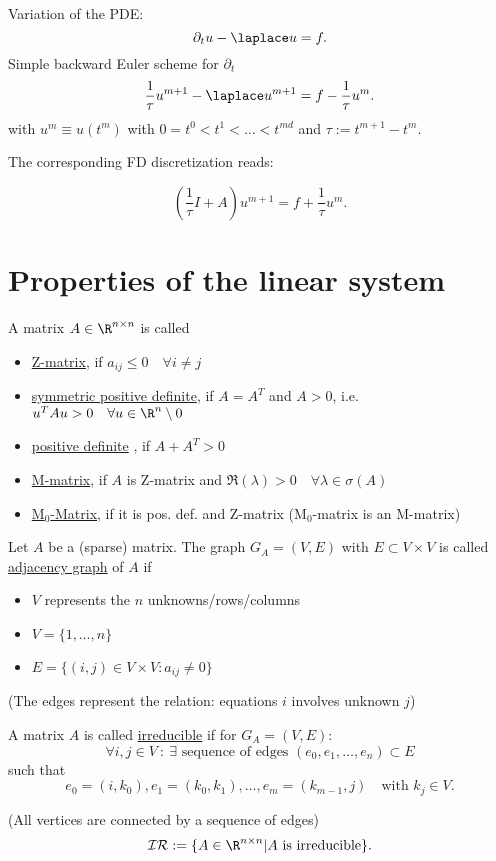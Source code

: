 Variation of the PDE:
\[
\partial_{t}u- \laplace u=f
.\] 
Simple backward Euler scheme for $\partial_{t}$
\[
\frac{1}{\tau}u^{m+1}- \laplace u^{m+1} = f -\frac{1}{\tau}u^{m}
.\] 
with $u^{m} \equiv u(t^{m})$ with $0=t^{0}<t^{1}< \ldots  < t^{md}$ and $\tau:=t^{m+1}-t^{m}$.

The corresponding FD discretization reads:

\[
	\left(\frac{1}{\tau}I + A\right) u^{m+1} = f + \frac{1}{\tau}u^{m}
.\] 

\section{Properties of the linear system}%
\label{sec:Properties of the linear system}

\begin{definition}
\label{thm:typeOfMatrices}
	A matrix $A \in  \R^{n \times n}$ is called
	\begin{itemize}
		\item \underline{Z-matrix}, if $a_{ij}\leq 0\quad \forall i\neq j$
		\item \underline{symmetric positive definite}, if $A=A^{T}$ and $A>0$, i.e. $u^{T}Au>0\quad\forall u \in \R^{n} \setminus 0$
		\item \underline{positive definite} , if $A+A^{T}>0$
		\item \underline{M-matrix}, if $A$ is Z-matrix and $\Re(\lambda) > 0 \quad\forall \lambda \in \sigma (A)$
		\item \underline{M$_{0}$-Matrix}, if it is pos. def. and Z-matrix (M$_{0}$-matrix is an M-matrix)
	\end{itemize}
\end{definition}

\begin{definition}
\label{thm:adjacenyGraph}
Let $A$ be a (sparse) matrix. The graph $G_{A}=(V,E)$ with $E \subset V \times V$ is called \underline{adjacency graph} of $A$ if 
\begin{itemize}[label=]
	\item $V$ represents the $n$ unknowns/rows/columns
	\item $V=\{1, \ldots, n\}$
	\item $E=\{(i,j) \in  V \times V : a_{ij}\neq 0\}$
\end{itemize}
(The edges represent the relation: equations $i$ involves unknown $j$)
\end{definition}

\begin{definition}
\label{thm:irreducible}
A matrix $A$ is called \underline{irreducible} if for $G_{A}=(V,E)$:
\[
	\forall i,j \in V ~:~ \exists \text{ sequence of edges } (e_0, e_1, \ldots , e_{n}) \subset E
\] 
such that
\[
	e_0=(i, k_0), e_1=(k_0,k_1),\ldots , e_{m}=(k_{m-1},j) \quad \text{with } k_{j} \in V
.\] 

(All vertices are connected by a sequence of edges)
\[
	\mathcal{IR}:= \{A \in  \R^{n \times  n} | A \text{ is irreducible}\}
.\] 
\end{definition}

